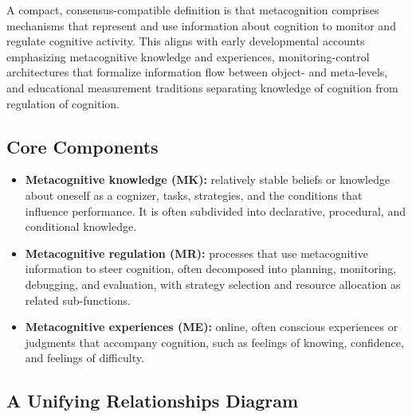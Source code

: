 \documentclass[a4paper]{article}
\begin{document}
   A compact, consensus-compatible definition is that metacognition comprises mechanisms that represent and use information about cognition to monitor and regulate cognitive activity. This aligns with early developmental accounts emphasizing metacognitive knowledge and experiences, monitoring-control architectures that formalize information flow between object- and meta-levels, and educational measurement traditions separating knowledge of cognition from regulation of cognition.

   \subsection{Core Components}

   \begin{itemize}
      \item \textbf{Metacognitive knowledge (MK):} relatively stable beliefs or knowledge about oneself as a cognizer, tasks, strategies, and the conditions that influence performance. It is often subdivided into declarative, procedural, and conditional knowledge.
      \item \textbf{Metacognitive regulation (MR):} processes that use metacognitive information to steer cognition, often decomposed into planning, monitoring, debugging, and evaluation, with strategy selection and resource allocation as related sub-functions.
      \item \textbf{Metacognitive experiences (ME):} online, often conscious experiences or judgments that accompany cognition, such as feelings of knowing, confidence, and feelings of difficulty.
   \end{itemize}

   \subsection{A Unifying Relationships Diagram}
\end{document}
